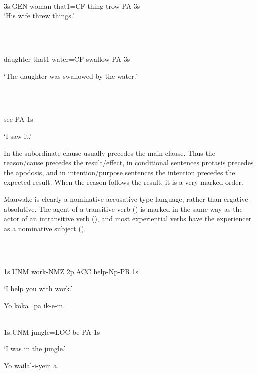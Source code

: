 \ea%
\label{ex:x656}
\gll \emphs{[Ona  emeria  nain=ke]}\emphs{  [maa]} \\
 3s.GEN  woman  that1=CF  thing  trow-PA-3s     \\
\glt `His wife threw things.'
\z


\ea%
\label{ex:x657}
\gll \emphs{[Wiipa}\emphs{  nain]}\emphs{  [eka=ke]} \\
      \\
\glt
\z

daughter  that1  water=CF  swallow-PA-3s

`The daughter was swallowed by the water.'

\ea%
\label{ex:x659}
\gll {} \\
      \\
\glt
\z

see-PA-1s

`I saw it.'

In  the subordinate clause usually precedes the main clause.  Thus the reason/cause precedes the result/effect, in conditional sentences protasis precedes the apodosis, and in intention/purpose sentences the intention precedes the expected result. When the reason follows the result, it is a very marked order.

Mauwake is clearly a nominative-accusative type language, rather than ergative-absolutive. The agent of a transitive verb () is marked in the same way as the actor of an intransitive verb (), and most experiential verbs have the experiencer as a nominative subject ().

\ea%
\label{ex:x1523}
\gll {} \\
      \\
\glt
\z

1s.UNM  work-NMZ  2p.ACC  help-Np-PR.1s

`I help you with work.'

\ea%
\label{ex:x1524}
\gll Yo  koka=pa  ik-e-m. \\
      \\
\glt
\z

1s.UNM  jungle=LOC  be-PA-1s

`I was in the jungle.'

\ea%
\label{ex:x1525}
\gll Yo  wailal-i-yem  a. \\
      \\
\glt
\z

